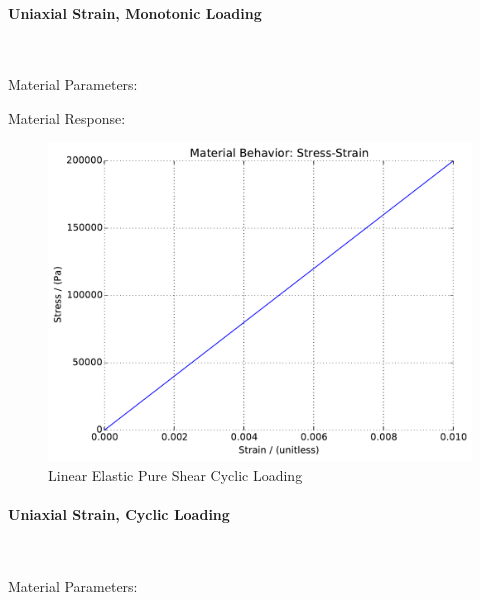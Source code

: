 \documentclass[fleqn,11pt]{article}
\begin{document}
\newpage
\paragraph{Uniaxial Strain, Monotonic Loading} ~ 

Material Parameters:


Material Response:
\begin{figure}[H]
\begin{center}
\includegraphics[width=12cm]{../fei_examples/2_1_linear_elastic/3uniaxial_strain_mono_loading/result.pdf}
\caption{
\label{linear_elastic_shear_mono}
Linear Elastic Pure Shear Cyclic Loading}
\end{center}
\end{figure}

\newpage
\paragraph{Uniaxial Strain, Cyclic Loading} ~

Material Parameters:

\end{document}
